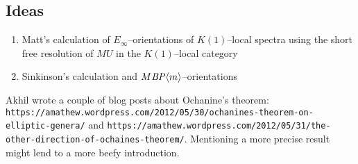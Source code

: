 \documentclass[12pt]{book}
\begin{document}
\subsection*{Ideas}
\begin{enumerate}
\item Matt's calculation of $E_\infty$--orientations of $K(1)$--local spectra using the short free resolution of $MU$ in the $K(1)$--local category
\item Sinkinson's calculation and $M\mathit{BP}\langle m\rangle$--orientations
\end{enumerate}

Akhil wrote a couple of blog posts about Ochanine's theorem: \texttt{https://amathew.wordpress.com/2012/05/30/ochanines-theorem-on-elliptic-genera/} and \texttt{https://amathew.wordpress.com/2012/05/31/the-other-direction-of-ochaines-theorem/}. Mentioning a more precise result might lend to a more beefy introduction.
\end{document}

